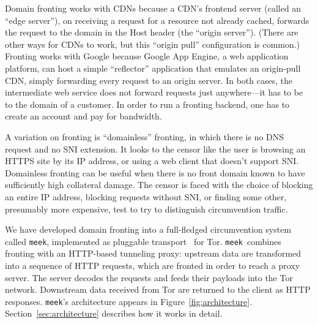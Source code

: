 \documentclass[conference]{IEEEtran}
\newcommand{\meek}{\texttt{meek}\xspace}
\begin{document}
Domain fronting works with CDNs because a CDN's frontend server
(called an ``edge server''),
on receiving a request for a resource not already cached,
forwards the request to the domain in the Host header
(the ``origin server'').
(There are other ways for CDNs to work, but this ``origin pull''
configuration is common.)
Fronting works with Google because Google App Engine, a web application platform,
can host a simple ``reflector'' application that emulates
an origin-pull CDN, simply forwarding every request to an origin server.
In both cases, the intermediate web service does not forward requests just anywhere---it
has to be to the domain of a customer.
In order to run a fronting backend,
one has to create an account and pay for bandwidth.

A variation on fronting is ``domainless'' fronting,
in which there is no DNS request and no SNI extension.
It looks to the censor
like the user is browsing an HTTPS site by its IP address,
or using a web client that doesn't support SNI.
Domainless fronting can be useful when there is no front domain
known to have sufficiently high collateral damage.
The censor is faced with the choice of blocking an entire IP address,
blocking requests without SNI,
or finding some other, presumably more expensive, test to try to distinguish
circumvention traffic.

We have developed domain fronting into a full-fledged circumvention system called \meek,
implemented as pluggable transport~\cite{pt} for Tor.
\meek\ combines fronting with an HTTP-based tunneling proxy:
upstream data are transformed into a sequence of HTTP requests,
which are fronted in order to reach a proxy server.
The server decodes the requests and feeds their payloads
into the Tor network.
Downstream data received from Tor
are returned to the client as HTTP responses.
\meek's architecture appears in Figure~\ref{fig:architecture}.
Section~\ref{sec:architecture} describes how it works in detail.
\end{document}
